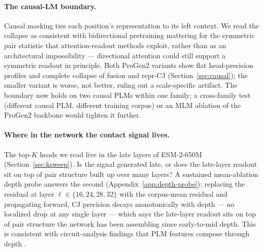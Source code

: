 \documentclass{article}
\begin{document}
\paragraph{The causal-LM boundary.}
Causal masking ties each position's representation to its left context.
We read the collapse as consistent with bidirectional pretraining
mattering for the symmetric pair statistic that attention-readout
methods exploit, rather than as an architectural impossibility ---
directional attention could still support a symmetric readout in
principle. Both ProGen2 variants show flat
head-precision profiles and complete collapse of fusion and repr-CJ
(Section~\ref{sec:causal}); the smaller variant is worse, not better,
ruling out a scale-specific artifact. The boundary now holds on two
causal PLMs within one family; a cross-family test (different causal
PLM, different training corpus) or an MLM ablation of the ProGen2
backbone would tighten it further.

\paragraph{Where in the network the contact signal lives.}
The top-$K$ heads we read live in the late layers of ESM-2-650M
(Section~\ref{sec:ksweep}). Is the signal generated late, or
does the late-layer readout sit on top of pair structure built up over
many layers? A sustained mean-ablation depth probe answers the second
(Appendix~\ref{app:depth-probe}): replacing the residual at layer
$\ell \in \{16, 24, 28, 32\}$ with the corpus-mean residual and
propagating forward, CJ precision decays monotonically with depth ---
no localized drop at any single layer --- which says the late-layer
readout sits on top of pair structure the network has been assembling
since early-to-mid depth. This is consistent with circuit-analysis findings
that PLM features compose through depth
\citep{adams2025plmsae,simon2025interplm}.
\end{document}
